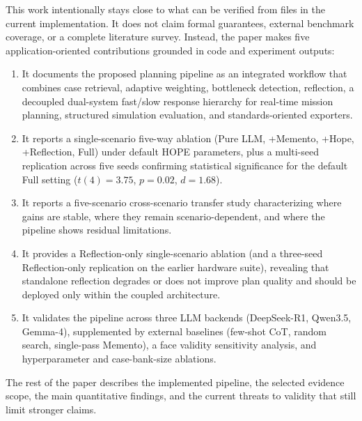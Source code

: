 This work intentionally stays close to what can be verified from files in the current implementation. It does not claim formal guarantees, external benchmark coverage, or a complete literature survey. Instead, the paper makes five application-oriented contributions grounded in code and experiment outputs:

\begin{enumerate}
\item It documents the proposed planning pipeline as an integrated workflow that combines case retrieval, adaptive weighting, bottleneck detection, reflection, a decoupled dual-system fast/slow response hierarchy for real-time mission planning, structured simulation evaluation, and standards-oriented exporters.
\item It reports a single-scenario five-way ablation (Pure LLM, +Memento, +Hope, +Reflection, Full) under default HOPE parameters, plus a multi-seed replication across five seeds confirming statistical significance for the default Full setting ($t(4)=3.75$, $p=0.02$, $d=1.68$).
\item It reports a five-scenario cross-scenario transfer study characterizing where gains are stable, where they remain scenario-dependent, and where the pipeline shows residual limitations.
\item It provides a Reflection-only single-scenario ablation (and a three-seed Reflection-only replication on the earlier hardware suite), revealing that standalone reflection degrades or does not improve plan quality and should be deployed only within the coupled architecture.
\item It validates the pipeline across three LLM backends (DeepSeek-R1, Qwen3.5, Gemma-4), supplemented by external baselines (few-shot CoT, random search, single-pass Memento), a face validity sensitivity analysis, and hyperparameter and case-bank-size ablations.
\end{enumerate}

The rest of the paper describes the implemented pipeline, the selected evidence scope, the main quantitative findings, and the current threats to validity that still limit stronger claims.
